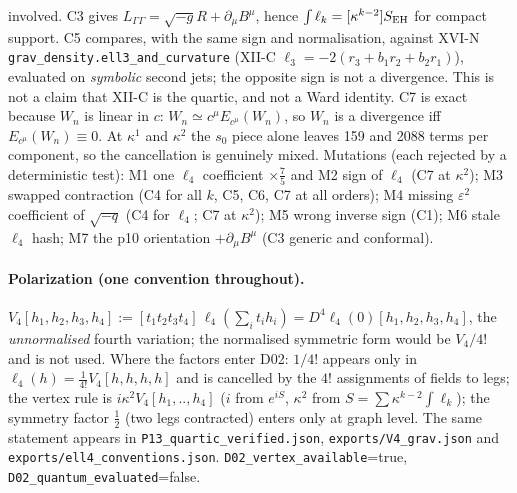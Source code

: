 involved. C3 gives $L_{\Gamma\Gamma}=\sqrt{-g}R+\partial_\mu B^\mu$, hence $\int\ell_k=[\kappa^{k-2}]S_{\rm EH}$ for
compact support. C5 compares, with the same sign and normalisation, against XVI-N
\texttt{grav\_density.ell3\_and\_curvature} (XII-C $\ell_3=-2(r_3+b_1r_2+b_2r_1)$), evaluated on \emph{symbolic}
second jets; the opposite sign is not a divergence. This is not a claim that XII-C is the quartic, and not a Ward
identity. C7 is exact because $W_n$ is linear in $c$: $W_n\simeq c^\mu E_{c^\mu}(W_n)$, so $W_n$ is a divergence iff
$E_{c^\mu}(W_n)\equiv0$. At $\kappa^1$ and $\kappa^2$ the $s_0$ piece alone leaves 159 and 2088 terms per component,
so the cancellation is genuinely mixed.
Mutations (each rejected by a deterministic test): M1 one $\ell_4$ coefficient $\times\tfrac75$ and M2 sign of $\ell_4$
(C7 at $\kappa^2$); M3 swapped contraction (C4 for all $k$, C5, C6, C7 at all orders); M4 missing $\varepsilon^2$
coefficient of $\sqrt{-q}$ (C4 for $\ell_4$; C7 at $\kappa^2$); M5 wrong inverse sign (C1); M6 stale $\ell_4$ hash; M7
the p10 orientation $+\partial_\mu B^\mu$ (C3 generic and conformal).

\paragraph{Polarization (one convention throughout).}
$V_4[h_1,h_2,h_3,h_4]:=[t_1t_2t_3t_4]\,\ell_4(\textstyle\sum_it_ih_i)=D^4\ell_4(0)[h_1,h_2,h_3,h_4]$, the
\emph{unnormalised} fourth variation; the normalised symmetric form would be $V_4/4!$ and is not used.
Where the factors enter D02: $1/4!$ appears only in $\ell_4(h)=\tfrac1{4!}V_4[h,h,h,h]$ and is cancelled by the $4!$
assignments of fields to legs; the vertex rule is $i\kappa^2V_4[h_1,..,h_4]$ ($i$ from $e^{iS}$, $\kappa^2$ from
$S=\sum\kappa^{k-2}\int\ell_k$); the symmetry factor $\tfrac12$ (two legs contracted) enters only at graph level. The
same statement appears in \texttt{P13\_quartic\_verified.json}, \texttt{exports/V4\_grav.json} and
\texttt{exports/ell4\_conventions.json}. \texttt{D02\_vertex\_available}=true, \texttt{D02\_quantum\_evaluated}=false.

